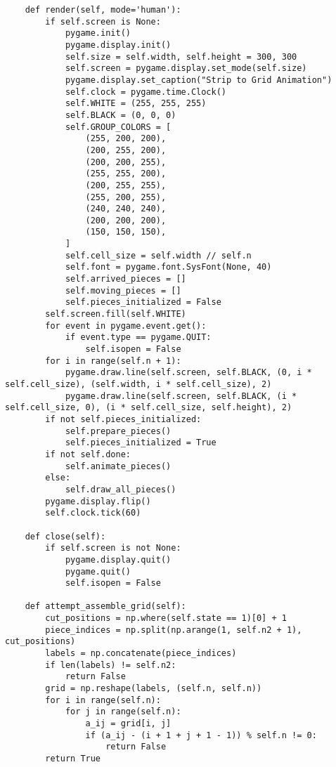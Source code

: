 \begin{lstlisting}
    def render(self, mode='human'):
        if self.screen is None:
            pygame.init()
            pygame.display.init()
            self.size = self.width, self.height = 300, 300
            self.screen = pygame.display.set_mode(self.size)
            pygame.display.set_caption("Strip to Grid Animation")
            self.clock = pygame.time.Clock()
            self.WHITE = (255, 255, 255)
            self.BLACK = (0, 0, 0)
            self.GROUP_COLORS = [
                (255, 200, 200),
                (200, 255, 200),
                (200, 200, 255),
                (255, 255, 200),
                (200, 255, 255),
                (255, 200, 255),
                (240, 240, 240),
                (200, 200, 200),
                (150, 150, 150),
            ]
            self.cell_size = self.width // self.n
            self.font = pygame.font.SysFont(None, 40)
            self.arrived_pieces = []
            self.moving_pieces = []
            self.pieces_initialized = False
        self.screen.fill(self.WHITE)
        for event in pygame.event.get():
            if event.type == pygame.QUIT:
                self.isopen = False
        for i in range(self.n + 1):
            pygame.draw.line(self.screen, self.BLACK, (0, i * self.cell_size), (self.width, i * self.cell_size), 2)
            pygame.draw.line(self.screen, self.BLACK, (i * self.cell_size, 0), (i * self.cell_size, self.height), 2)
        if not self.pieces_initialized:
            self.prepare_pieces()
            self.pieces_initialized = True
        if not self.done:
            self.animate_pieces()
        else:
            self.draw_all_pieces()
        pygame.display.flip()
        self.clock.tick(60)

    def close(self):
        if self.screen is not None:
            pygame.display.quit()
            pygame.quit()
            self.isopen = False

    def attempt_assemble_grid(self):
        cut_positions = np.where(self.state == 1)[0] + 1
        piece_indices = np.split(np.arange(1, self.n2 + 1), cut_positions)
        labels = np.concatenate(piece_indices)
        if len(labels) != self.n2:
            return False
        grid = np.reshape(labels, (self.n, self.n))
        for i in range(self.n):
            for j in range(self.n):
                a_ij = grid[i, j]
                if (a_ij - (i + 1 + j + 1 - 1)) % self.n != 0:
                    return False
        return True


\end{lstlisting}
